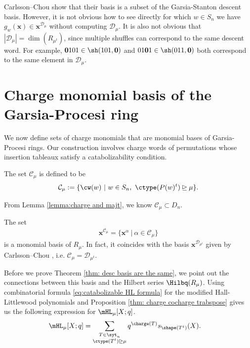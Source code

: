 \begin{rema}
    Carlsson--Chou show that their basis is a subset of the Garsia-Stanton descent basis. 
However, it is not obvious how to see directly for which $w\in S_n$ we have $g_w(\mathbf{x}) \in \mathbf{x}^{\mathcal{D}_{\mu}}$ without computing $\mathcal{D}_\mu$.
It is also not obvious that $|\mathcal{D}_{\mu}| = \dim(R_{\mu^t})$, since multiple shuffles can correspond to the same descent word. For example, $\mathbf{0}101 \in \sh(101,\mathbf{0})$ and $01\mathbf{0}1 \in \sh(011,\mathbf{0})$ both correspond to the same element in $\mathcal{D}_{\mu}$.

\end{rema}

\section{Charge monomial basis of the Garsia-Procesi ring}\label{section:descent basis}
We now define sets of charge monomials that are monomial bases of Garsia-Procesi rings.
Our construction involves charge words of permutations whose insertion tableaux satisfy a catabolizability condition.

\begin{defi}
    The set $\mathcal{C}_\mu$ is defined to be
\begin{align}\label{def:C_mu}
    \mathcal{C}_\mu := \{\cw(w)\ | \ w\in S_n, \  \ctype(P(w) ^t)\unrhd\mu\}.
\end{align}
\end{defi}

From Lemma \ref{lemma:charge and majt}, we know $\mathcal{C}_\mu\subset D_n$.

\begin{thm1}
\makeatletter{}\makeatother
\label{thm: desc basis are the same} 
    The set 
    \begin{align}\label{eq: our basis}
        \mathbf{x}^{\mathcal{C}_\mu} = \{\mathbf{x}^\alpha \ | \ \alpha \in \mathcal{C}_\mu\}
    \end{align}
     is a monomial basis of $R_{\mu}$. 
       In fact, it coincides with the basis $  \mathbf{x}^{\mathcal{D}_{\mu^t}}$ given by Carlsson--Chou \cite{CC}, i.e. $\mathcal{C}_\mu = \mathcal{D}_{\mu^t}$.
\end{thm1}

Before we prove Theorem \ref{thm: desc basis are the same}, we point out the connections between this basis and the Hilbert series $\Hilbq(R_{\mu})$.
Using combinatorial formula \eqref{eq:catabolizable HL formula} for the modified Hall-Littlewood polynomials and Proposition \ref{thm: charge cocharge trabspose} gives us the following expression for $\mHL_{\mu}[X;q]$.
\begin{align}
    \mHL_{\mu} [X;q] &=  \sum\limits_{\substack{T\in \syt_n\\  \ctype(T^t)\unrhd\mu}}  q^{\charge(T)} s_{\shape(T^t)}(X).
\end{align}

